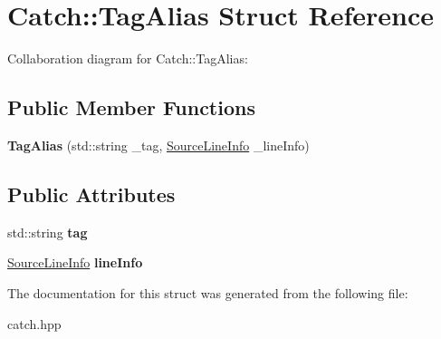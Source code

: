 \hypertarget{structCatch_1_1TagAlias}{}\section{Catch\+:\+:Tag\+Alias Struct Reference}
\label{structCatch_1_1TagAlias}


Collaboration diagram for Catch\+:\+:Tag\+Alias\+:
\subsection*{Public Member Functions}
\begin{DoxyCompactItemize}
\item 
{\bfseries Tag\+Alias} (std\+::string \+\_\+tag, \hyperlink{structCatch_1_1SourceLineInfo}{Source\+Line\+Info} \+\_\+line\+Info)\hypertarget{structCatch_1_1TagAlias_ad9124d03bfb6f767f1c97572330b05bc}{}\label{structCatch_1_1TagAlias_ad9124d03bfb6f767f1c97572330b05bc}

\end{DoxyCompactItemize}
\subsection*{Public Attributes}
\begin{DoxyCompactItemize}
\item 
std\+::string {\bfseries tag}\hypertarget{structCatch_1_1TagAlias_a950183883ab17c90d0fab16b966b6e2d}{}\label{structCatch_1_1TagAlias_a950183883ab17c90d0fab16b966b6e2d}

\item 
\hyperlink{structCatch_1_1SourceLineInfo}{Source\+Line\+Info} {\bfseries line\+Info}\hypertarget{structCatch_1_1TagAlias_a2f51fe0b3c052561275d26b6eb88f702}{}\label{structCatch_1_1TagAlias_a2f51fe0b3c052561275d26b6eb88f702}

\end{DoxyCompactItemize}


The documentation for this struct was generated from the following file\+:\begin{DoxyCompactItemize}
\item 
catch.\+hpp\end{DoxyCompactItemize}

